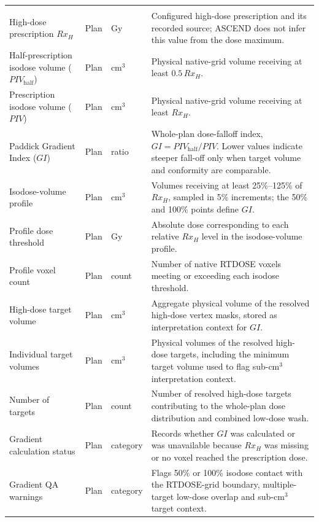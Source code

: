{\begin{longtable}{
  >{\raggedright\arraybackslash}p{3.0cm}
  >{\centering\arraybackslash}p{1.25cm}
  >{\centering\arraybackslash}p{1.45cm}
  >{\raggedright\arraybackslash}p{9.45cm}}
\addlinespace[4pt]
\multicolumn{4}{l}{\textbf{ICRU Report 91-context dose-gradient outputs}}\\*
\addlinespace[2pt]
High-dose prescription $Rx_H$ & Plan & Gy & Configured high-dose prescription and its recorded source; ASCEND does not infer this value from the dose maximum. \\
Half-prescription isodose volume ($PIV_{\mathrm{half}}$) & Plan & cm$^{3}$ & Physical native-grid volume receiving at least $0.5\,Rx_H$. \\
Prescription isodose volume ($PIV$) & Plan & cm$^{3}$ & Physical native-grid volume receiving at least $Rx_H$. \\
Paddick Gradient Index ($GI$) & Plan & ratio & Whole-plan dose-falloff index, $GI=PIV_{\mathrm{half}}/PIV$. Lower values indicate steeper fall-off only when target volume and conformity are comparable. \\
Isodose-volume profile & Plan & cm$^{3}$ & Volumes receiving at least 25\%--125\% of $Rx_H$, sampled in 5\% increments; the 50\% and 100\% points define $GI$. \\
Profile dose threshold & Plan & Gy & Absolute dose corresponding to each relative $Rx_H$ level in the isodose-volume profile. \\
Profile voxel count & Plan & count & Number of native RTDOSE voxels meeting or exceeding each isodose threshold. \\
High-dose target volume & Plan & cm$^{3}$ & Aggregate physical volume of the resolved high-dose vertex masks, stored as interpretation context for $GI$. \\
Individual target volumes & Plan & cm$^{3}$ & Physical volumes of the resolved high-dose targets, including the minimum target volume used to flag sub-cm$^{3}$ interpretation context. \\
Number of targets & Plan & count & Number of resolved high-dose targets contributing to the whole-plan dose distribution and combined low-dose wash. \\
Gradient calculation status & Plan & category & Records whether $GI$ was calculated or was unavailable because $Rx_H$ was missing or no voxel reached the prescription dose. \\
Gradient QA warnings & Plan & category & Flags 50\% or 100\% isodose contact with the RTDOSE-grid boundary, multiple-target low-dose overlap and sub-cm$^{3}$ target context. \\


\end{longtable}}
